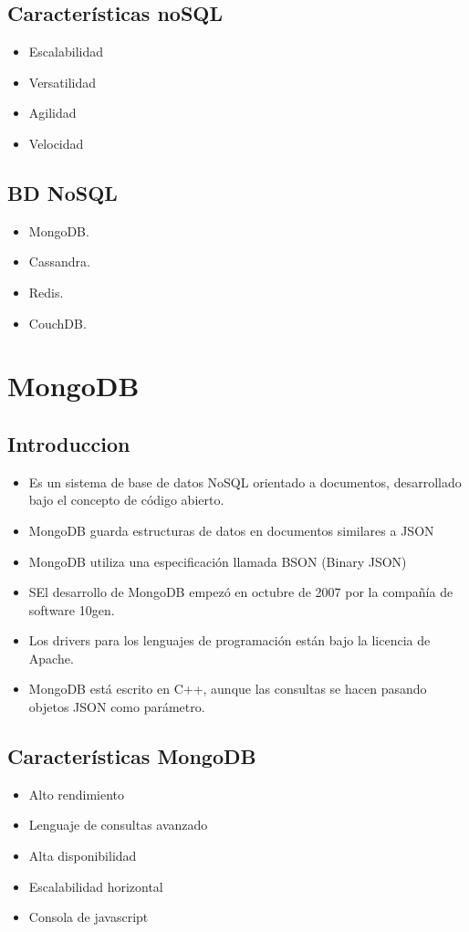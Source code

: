 \documentclass[4paper]{article}
\begin{document}
\newpage
\subsection{Características noSQL}
\begin{itemize}
\item Escalabilidad
\item Versatilidad
\item Agilidad
\item Velocidad
\end{itemize}


\subsection{BD NoSQL}
\begin{itemize}
\item MongoDB.
\item Cassandra.
\item Redis.
\item CouchDB.
\end{itemize}

\section{MongoDB}
\subsection{Introduccion}
\begin{itemize}
\item Es un sistema de base de datos NoSQL orientado a documentos, desarrollado bajo el concepto de código abierto.
\item MongoDB guarda estructuras de datos en documentos similares a JSON 
\item MongoDB utiliza una especificación llamada BSON (Binary JSON)
\item SEl desarrollo de MongoDB empezó en octubre de 2007 por la compañía de software 10gen.
\item Los drivers para los lenguajes de programación están bajo la licencia de Apache. 
\item MongoDB está escrito en C++, aunque las consultas se hacen pasando objetos JSON como parámetro.
\end{itemize}

\subsection{Características MongoDB}
\begin{itemize}
\item Alto rendimiento
\item Lenguaje de consultas avanzado
\item Alta disponibilidad
\item Escalabilidad horizontal
\item Consola de javascript
\end{itemize}
\end{document}
